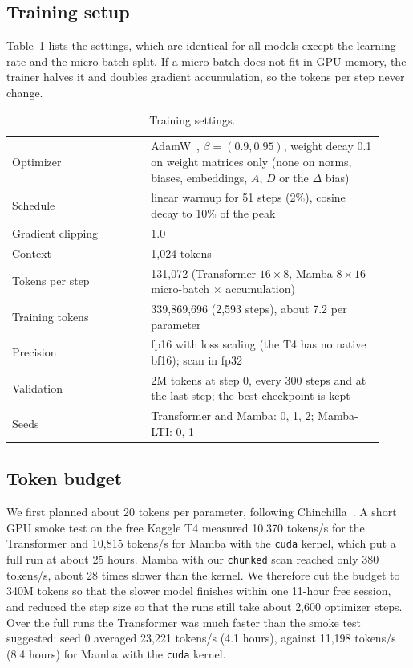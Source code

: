 \documentclass[conference]{IEEEtran}
\begin{document}
\subsection{Training setup}
Table~\ref{tab:train} lists the settings, which are identical for all models except the learning rate
and the micro-batch split. If a micro-batch does not fit in GPU memory, the trainer halves it and
doubles gradient accumulation, so the tokens per step never change.

\begin{table}[t]
\centering
\caption{Training settings.}
\label{tab:train}
\begin{tabular}{@{}p{0.34\linewidth}p{0.58\linewidth}@{}}
\toprule
Optimizer & AdamW~\cite{loshchilov2019adamw}, $\beta = (0.9, 0.95)$, weight decay 0.1 on weight matrices only (none on norms, biases, embeddings, $A$, $D$ or the $\Delta$ bias) \\
Schedule & linear warmup for 51 steps (2\%), cosine decay to 10\% of the peak \\
Gradient clipping & 1.0 \\
Context & 1,024 tokens \\
Tokens per step & 131,072 (Transformer $16 \times 8$, Mamba $8 \times 16$ micro-batch $\times$ accumulation) \\
Training tokens & 339,869,696 (2,593 steps), about 7.2 per parameter \\
Precision & fp16 with loss scaling (the T4 has no native bf16); scan in fp32 \\
Validation & 2M tokens at step 0, every 300 steps and at the last step; the best checkpoint is kept \\
Seeds & Transformer and Mamba: 0, 1, 2; Mamba-LTI: 0, 1 \\
\bottomrule
\end{tabular}
\end{table}

\subsection{Token budget}
We first planned about 20 tokens per parameter, following Chinchilla~\cite{hoffmann2022chinchilla}. A
short GPU smoke test on the free Kaggle T4 measured 10,370 tokens/s for the Transformer and
10,815 tokens/s for Mamba with the \texttt{cuda} kernel, which put a full run at about 25 hours. Mamba
with our \texttt{chunked} scan reached only 380 tokens/s, about 28 times slower than the kernel. We
therefore cut the budget to 340M tokens so that the slower model finishes within one 11-hour free
session, and reduced the step size so that the runs still take about 2,600 optimizer steps. Over the
full runs the Transformer was much faster than the smoke test suggested: seed 0 averaged
23,221 tokens/s (4.1 hours), against 11,198 tokens/s (8.4 hours) for Mamba with the \texttt{cuda}
kernel.
\end{document}
